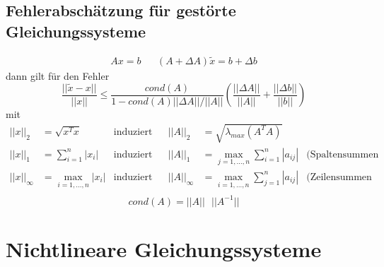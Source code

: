 \documentclass[
ngerman,
accentcolor=9c,%
type=intern,
marginpar=false
]{tudapub}
\begin{document}
        \subsection{Fehlerabschätzung für gestörte Gleichungssysteme}
            \begin{align*}
                Ax = b && (A+ \Delta A)\tilde{x} = b + \Delta b
            \end{align*}
            dann gilt für den Fehler
            \begin{equation*}
                \dfrac{||\tilde{x} - x||}{||x||} \leq \dfrac{cond(A)}{1-cond(A)||\Delta A|| / ||A||} \left(\dfrac{||\Delta A||}{||A||} + \dfrac{|| \Delta b||}{||b||}\right)
            \end{equation*}
            mit
            \begin{align*} %
                ||x||_2 &= \sqrt{x^Tx} & \text{induziert} &&||A||_2 &= \sqrt{\lambda_{max}(A^TA)}\\
                ||x||_1 &= \sum^n_{i=1}|x_i| & \text{induziert} && ||A||_1 &= \max_{j=1,\dots,n} \sum^n_{i=1} |a_{ij}| & \text{(Spaltensummen Norm = ``größte'' Spalte)}\\
                ||x||_\infty &= \max_{i=1,\dots,n}|x_i| & \text{induziert} && ||A||_\infty &= \max_{i=1,\dots,n} \sum^n_{j=1} |a_{ij}| & \text{(Zeilensummen Norm = ``größte'' Zeile)}\\
            \end{align*}
            \begin{equation*}
                cond(A) = ||A||\mbox{ }||A^{-1}||
            \end{equation*}

    \newpage
    \section{Nichtlineare Gleichungssysteme}
\end{document}
